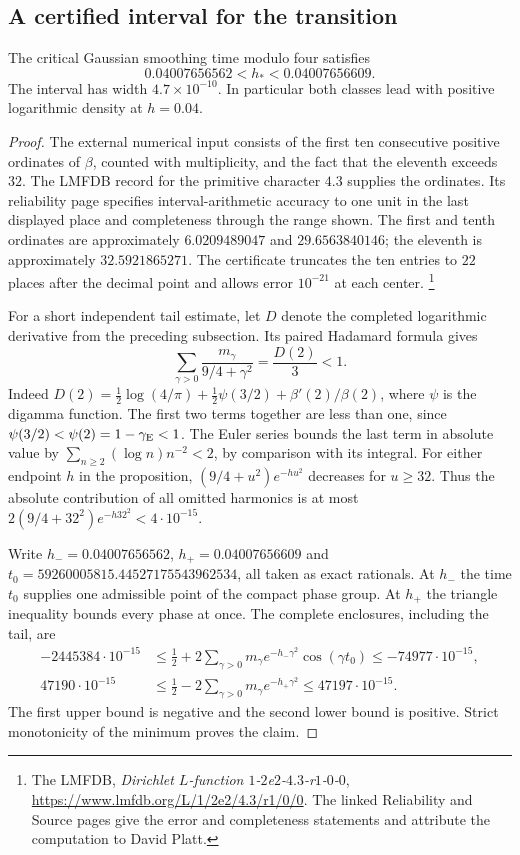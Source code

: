 \subsection{A certified interval for the transition}
\label{sec:enclosure}

\begin{proposition}\label{prop:enclosure}
The critical Gaussian smoothing time modulo four satisfies
\[
                   0.04007656562<h_*<0.04007656609 .
\]
The interval has width $4.7\times10^{-10}$. In particular both classes lead with positive logarithmic density at
$h=0.04$.
\end{proposition}

\begin{proof}
The external numerical input consists of the first ten consecutive
positive ordinates of $\beta$, counted with multiplicity, and the fact
that the eleventh exceeds $32$. The LMFDB record for the primitive
character $4.3$ supplies the ordinates. Its reliability page specifies
interval-arithmetic accuracy to one unit in the last displayed place
and completeness through the range shown. The first and tenth
ordinates are approximately $6.0209489047$ and $29.6563840146$; the
eleventh is approximately $32.5921865271$. The certificate truncates
the ten entries to $22$ places after the decimal point and allows
error $10^{-21}$ at each center.%
\footnote{The LMFDB, \emph{Dirichlet $L$-function $1$-$2$e$2$-$4.3$-r$1$-$0$-$0$},
\url{https://www.lmfdb.org/L/1/2e2/4.3/r1/0/0}.
The linked Reliability and Source pages give the error and completeness
statements and attribute the computation to David Platt.}

For a short independent tail estimate, let $D$ denote the completed
logarithmic derivative from the preceding subsection. Its paired
Hadamard formula gives
\[
 \sum_{\gamma>0}\frac{m_\gamma}{9/4+\gamma^2}
   =\frac{D(2)}{3}<1.
\]
Indeed
$D(2)=\tfrac12\log(4/\pi)+\tfrac12\psi(3/2)+\beta'(2)/\beta(2)$,
where $\psi$ is the digamma function. The first two terms together
are less than one, since $\psi(3/2)<\psi(2)=1-\gamma_{\rm E}<1$.
The Euler series bounds the last term in absolute value by
$\sum_{n\ge2}(\log n)n^{-2}<2$, by comparison with its integral.
For either endpoint $h$ in the proposition, $(9/4+u^2)e^{-hu^2}$
decreases for $u\ge32$. Thus the absolute contribution of all
omitted harmonics is at most $2(9/4+32^2)e^{-h32^2}<4\cdot10^{-15}$.

Write $h_-=0.04007656562$, $h_+=0.04007656609$ and
$t_0=59260005815.44527175543962534$, all taken as exact rationals.
At $h_-$ the time $t_0$ supplies one admissible point of the compact
phase group. At $h_+$ the triangle inequality bounds every phase at
once. The complete enclosures, including the tail, are
\begin{align*}
 -2445384\cdot10^{-15}
 &\le \tfrac12+2\sum_{\gamma>0}m_\gamma
      e^{-h_-\gamma^2}\cos(\gamma t_0)
    \le-74977\cdot10^{-15},\\
 47190\cdot10^{-15}
 &\le \tfrac12-2\sum_{\gamma>0}m_\gamma e^{-h_+\gamma^2}
    \le47197\cdot10^{-15}.
\end{align*}
The first upper bound is negative and the second lower bound is
positive. Strict monotonicity of the minimum proves the claim.


\end{proof}
